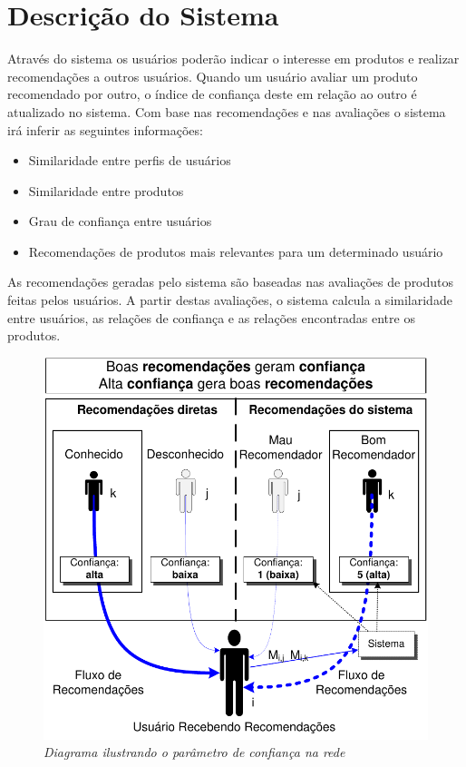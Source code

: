 
\section{Descrição do Sistema}
\label{sec:descricao_sistema}

 Através do sistema os usuários poderão indicar o interesse em produtos e realizar recomendações a outros usuários. Quando um usuário avaliar um produto recomendado por outro, o índice de confiança deste em relação ao outro é atualizado no sistema. Com base nas recomendações e nas avaliações o sistema irá inferir as seguintes informações:
 
\begin{itemize}

 \item Similaridade entre perfis de usuários

 \item Similaridade entre produtos

 \item Grau de confiança entre usuários

 \item Recomendações de produtos mais relevantes para um determinado usuário

\end{itemize}

 As recomendações geradas pelo sistema são baseadas nas avaliações de produtos feitas pelos usuários. A partir destas avaliações, o sistema calcula a similaridade entre usuários, as relações de confiança e as relações encontradas entre os produtos.

\begin{figure}[htp]
 \centering
 \includegraphics[width=\textwidth]{imagens/diagrama_confianca}
 \caption{\it Diagrama ilustrando o parâmetro de confiança na rede}
 \label{fig:diagrama_confianca}
\end{figure}
 
